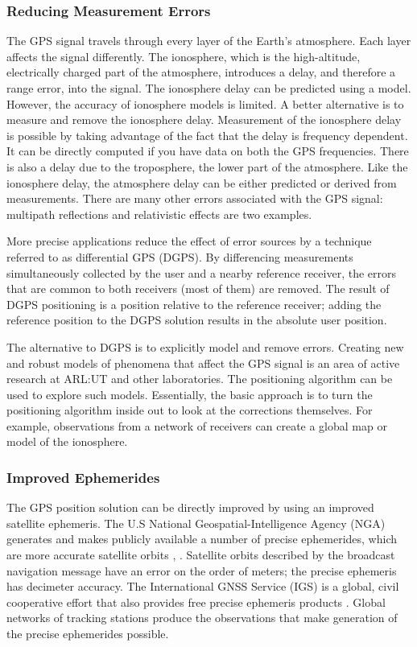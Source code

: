 \subsubsection{Reducing Measurement Errors}

The GPS signal travels through every layer of the Earth's atmosphere. Each layer affects the signal differently. The ionosphere, which is the high-altitude, electrically charged part of the atmosphere, introduces a delay, and therefore a range error, into the signal. The ionosphere delay can be predicted using a model. However, the accuracy of ionosphere models is limited. A better alternative is to measure and remove the ionosphere delay. Measurement of the ionosphere delay is possible by taking advantage of the fact that the delay is frequency dependent. It can be directly computed if you have data on both the GPS frequencies. There is also a delay due to the troposphere, the lower part of the atmosphere. Like the ionosphere delay, the atmosphere delay can be either predicted or derived from measurements. There are many other errors associated with the GPS signal: multipath reflections and relativistic effects are two examples.

More precise applications reduce the effect of error sources by a technique referred to as differential GPS (DGPS). By differencing measurements simultaneously collected by the user and a nearby reference receiver, the errors that are common to both receivers (most of them) are removed. The result of DGPS positioning is a position relative to the reference receiver; adding the reference position to the DGPS solution results in the absolute user position.

The alternative to DGPS is to explicitly model and remove errors. Creating new and robust models of phenomena that affect the GPS signal is an area of active research at ARL:UT and other laboratories. The positioning algorithm can be used to explore such models. Essentially, the basic approach is to turn the positioning algorithm inside out to look at the corrections themselves. For example, observations from a network of receivers can create a global map or model of the ionosphere.


\subsubsection{Improved Ephemerides}

The GPS position solution can be directly improved by using an improved satellite ephemeris. The U.S National Geospatial-Intelligence Agency (NGA) generates and makes publicly available a number of precise ephemerides, which are more accurate satellite orbits \cite{ion:gnss04}, \cite{nga:website}. Satellite orbits described by the broadcast navigation message have an error on the order of meters; the precise ephemeris has decimeter accuracy. The International GNSS Service (IGS) is a global, civil cooperative effort that also provides free precise ephemeris products \cite{igs:reference}. Global networks of tracking stations produce the observations that make generation of the precise ephemerides possible.



